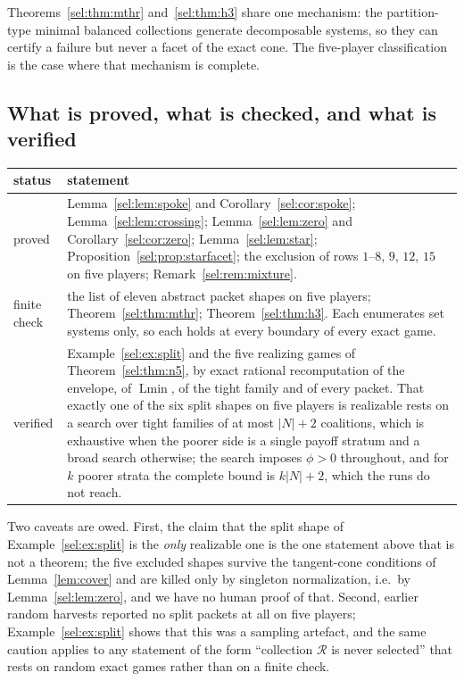 \documentclass[11pt]{article}
\newcommand{\Lmin}{\operatorname{Lmin}}
\begin{document}
Theorems~\ref{sel:thm:mthr} and~\ref{sel:thm:h3} share one mechanism: the
partition-type minimal balanced collections generate decomposable systems, so
they can certify a failure but never a facet of the exact cone.  The
five-player classification is the case where that mechanism is complete.

\subsection{What is proved, what is checked, and what is verified}

\begin{center}
\begin{tabular}{lp{}}
\toprule
\textbf{status} & \textbf{statement}\\
\midrule
proved &
 Lemma~\ref{sel:lem:spoke} and Corollary~\ref{sel:cor:spoke};
 Lemma~\ref{sel:lem:crossing}; Lemma~\ref{sel:lem:zero} and
 Corollary~\ref{sel:cor:zero}; Lemma~\ref{sel:lem:star};
 Proposition~\ref{sel:prop:starfacet}; the exclusion of rows $1$--$8$, $9$,
 $12$, $15$ on five players; Remark~\ref{sel:rem:mixture}.\\
finite check &
 the list of eleven abstract packet shapes on five players;
 Theorem~\ref{sel:thm:mthr}; Theorem~\ref{sel:thm:h3}.  Each enumerates set
 systems only, so each holds at every boundary of every exact game.\\
verified &
 Example~\ref{sel:ex:split} and the five realizing games of
 Theorem~\ref{sel:thm:n5}, by exact rational recomputation of the envelope, of
 $\Lmin$, of the tight family and of every packet.  That exactly one of the six
 split shapes on five players is realizable rests on a search over tight
 families of at most $|N|+2$ coalitions, which is exhaustive when the poorer
 side is a single payoff stratum and a broad search otherwise; the search
 imposes $\phi>0$ throughout, and for $k$ poorer strata the complete bound
 is $k|N|+2$, which the runs do not reach.\\
\bottomrule
\end{tabular}
\end{center}

Two caveats are owed.  First, the claim that the split shape of
Example~\ref{sel:ex:split} is the \emph{only} realizable one is the one
statement above that is not a theorem; the five excluded shapes survive the
tangent-cone conditions of Lemma~\ref{lem:cover} and are killed only by
singleton normalization, i.e.\ by Lemma~\ref{sel:lem:zero}, and we have no
human proof of that.  Second, earlier random harvests reported no split packets
at all on five players; Example~\ref{sel:ex:split} shows that this was a
sampling artefact, and the same caution applies to any statement of the form
``collection $\mathcal R$ is never selected'' that rests on random exact games
rather than on a finite check.
\end{document}
